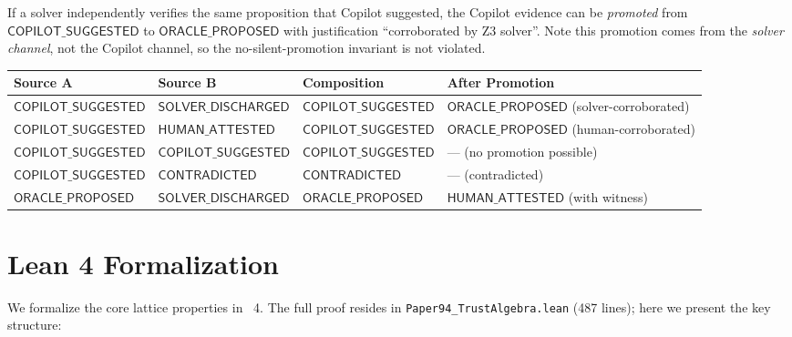 \documentclass[11pt]{article}
\newcommand{\CopSugg}{\mathsf{COPILOT\_SUGGESTED}}
\newcommand{\SolDis}{\mathsf{SOLVER\_DISCHARGED}}
\newcommand{\OracProp}{\mathsf{ORACLE\_PROPOSED}}
\newcommand{\HumAtt}{\mathsf{HUMAN\_ATTESTED}}
\newcommand{\Contra}{\mathsf{CONTRADICTED}}
\begin{document}
\begin{example}\label{ex:promotion}
If a solver independently verifies the same proposition that Copilot
suggested, the Copilot evidence can be \emph{promoted} from $\CopSugg$ to
$\OracProp$ with justification ``corroborated by Z3 solver''.  Note this
promotion comes from the \emph{solver channel}, not the Copilot channel,
so the no-silent-promotion invariant is not violated.
\end{example}

\begin{center}
\begin{tabular}{llll}
\toprule
\textbf{Source A} & \textbf{Source B} & \textbf{Composition} & \textbf{After Promotion} \\
\midrule
$\CopSugg$  & $\SolDis$   & $\CopSugg$  & $\OracProp$ (solver-corroborated) \\
$\CopSugg$  & $\HumAtt$   & $\CopSugg$  & $\OracProp$ (human-corroborated) \\
$\CopSugg$  & $\CopSugg$  & $\CopSugg$  & --- (no promotion possible) \\
$\CopSugg$  & $\Contra$   & $\Contra$   & --- (contradicted) \\
$\OracProp$ & $\SolDis$   & $\OracProp$ & $\HumAtt$ (with witness) \\
\bottomrule
\end{tabular}
\end{center}

\section{Lean 4 Formalization}\label{sec:lean}

We formalize the core lattice properties in \LEAN~4.  The full proof resides
in \texttt{Paper94\_TrustAlgebra.lean} (487 lines); here we present the key
structure:
\end{document}
